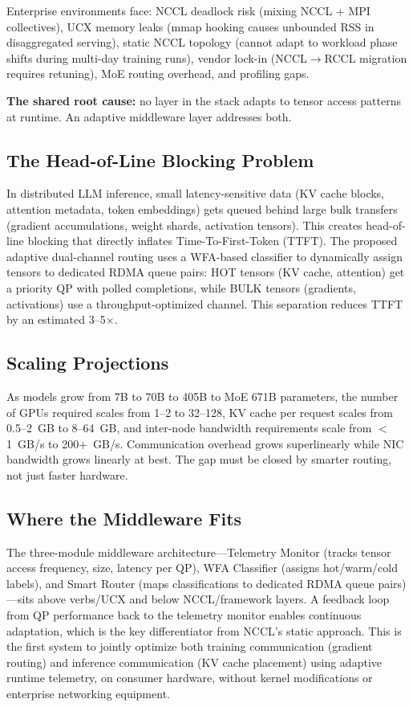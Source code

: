 \documentclass[11pt,letterpaper]{article}
\theoremstyle{definition}
\begin{document}
Enterprise environments face: NCCL deadlock risk (mixing NCCL + MPI collectives), UCX memory leaks (mmap hooking causes unbounded RSS in disaggregated serving), static NCCL topology (cannot adapt to workload phase shifts during multi-day training runs), vendor lock-in (NCCL$\to$RCCL migration requires retuning), MoE routing overhead, and profiling gaps.

\textbf{The shared root cause:} no layer in the stack adapts to tensor access patterns at runtime. An adaptive middleware layer addresses both.

\subsection{The Head-of-Line Blocking Problem}

In distributed LLM inference, small latency-sensitive data (KV cache blocks, attention metadata, token embeddings) gets queued behind large bulk transfers (gradient accumulations, weight shards, activation tensors). This creates head-of-line blocking that directly inflates Time-To-First-Token (TTFT). The proposed adaptive dual-channel routing uses a WFA-based classifier to dynamically assign tensors to dedicated RDMA queue pairs: HOT tensors (KV cache, attention) get a priority QP with polled completions, while BULK tensors (gradients, activations) use a throughput-optimized channel. This separation reduces TTFT by an estimated 3--5$\times$.

\subsection{Scaling Projections}

As models grow from 7B to 70B to 405B to MoE 671B parameters, the number of GPUs required scales from 1--2 to 32--128, KV cache per request scales from 0.5--2~GB to 8--64~GB, and inter-node bandwidth requirements scale from $<$1~GB/s to 200+~GB/s. Communication overhead grows superlinearly while NIC bandwidth grows linearly at best. The gap must be closed by smarter routing, not just faster hardware.

\subsection{Where the Middleware Fits}

The three-module middleware architecture---Telemetry Monitor (tracks tensor access frequency, size, latency per QP), WFA Classifier (assigns hot/warm/cold labels), and Smart Router (maps classifications to dedicated RDMA queue pairs)---sits above verbs/UCX and below NCCL/framework layers. A feedback loop from QP performance back to the telemetry monitor enables continuous adaptation, which is the key differentiator from NCCL's static approach. This is the first system to jointly optimize both training communication (gradient routing) and inference communication (KV cache placement) using adaptive runtime telemetry, on consumer hardware, without kernel modifications or enterprise networking equipment.
\end{document}
